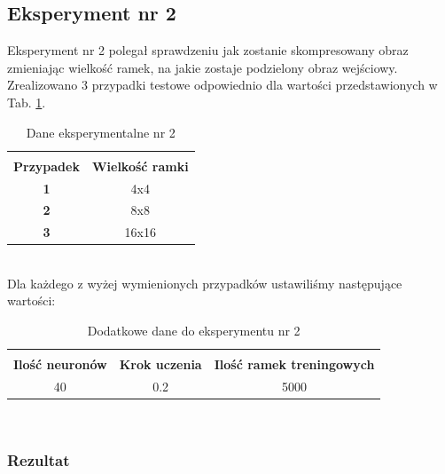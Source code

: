 \documentclass[12pt]{article}
\begin{document}
\clearpage
\subsection{Eksperyment nr 2}

Eksperyment nr 2 polegał sprawdzeniu jak zostanie skompresowany obraz zmieniając wielkość ramek, na jakie zostaje podzielony obraz wejściowy. Zrealizowano 3 przypadki testowe odpowiednio dla wartości przedstawionych w Tab.
\ref{dane eksperymentalne doświadczenia 2}. \\
\begin{table}[h!]
 \caption{Dane eksperymentalne nr 2}
 \centering
 \vspace{0.2cm}
 \begin{tabular}{c c}
  \hline\hline\\[-0.4cm]
  \textbf{Przypadek} & \textbf{Wielkość ramki} \\[0.1cm]
  \textbf{1} & 4x4  \\
  \textbf{2} & 8x8  \\
  \textbf{3} & 16x16  \\ [0.1cm]
  \hline
 \end{tabular}
 \label{dane eksperymentalne doświadczenia 2}
\end{table} \\

Dla każdego z wyżej wymienionych przypadków ustawiliśmy następujące wartości: \\
\begin{table}[h!]
 \caption{Dodatkowe dane do eksperymentu nr 2}
 \centering
 \vspace{0.2cm}
 \begin{tabular}{c c c}
  \hline\hline\\[-0.4cm]
  \textbf{Ilość neuronów} & \textbf{Krok uczenia} & \textbf{Ilość ramek treningowych} \\[0.1cm]
  40 & 0.2 & 5000  \\ [0.1cm]
  \hline
 \end{tabular}
 \label{dodatkowe dane do eksperymentu nr 2}
\end{table} \\

\newpage
\subsubsection{Rezultat}
\end{document}
